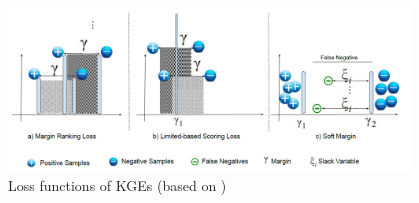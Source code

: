 \begin{figure}[t]
  \centering
    \includegraphics[width=0.95\textwidth]{figures/loss_functions.PNG}
  \caption{Loss functions of \acp{KGE} (based on \cite{9207513})}
  \label{fig:overview}
\end{figure}

